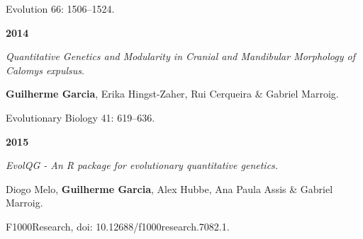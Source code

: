 \documentclass[12pt,twoside]{report}
\begin{document}
Evolution 66: 1506–1524.

\vspace {0.3 cm}

\textbf{2014}

\textit{Quantitative Genetics and Modularity in Cranial and Mandibular Morphology of \emph{Calomys expulsus}}.

\textbf {Guilherme Garcia}, Erika Hingst-Zaher, Rui Cerqueira \& Gabriel Marroig.

Evolutionary Biology 41: 619–636.

\vspace {0.3 cm}

\textbf{2015}

\textit {EvolQG - An R package for evolutionary quantitative genetics.}

Diogo Melo, \textbf{Guilherme Garcia}, Alex Hubbe, Ana Paula Assis \& Gabriel Marroig.  

F1000Research, doi: 10.12688/f1000research.7082.1.






\end{document}
